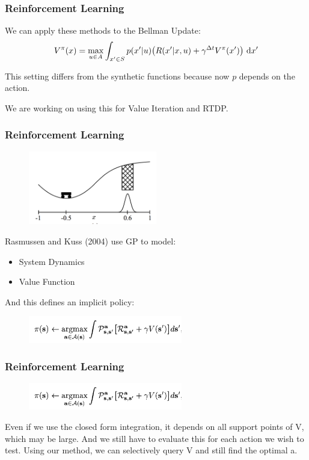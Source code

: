 \documentclass[11pt]{beamer}
\begin{document}
\begin{frame}
\frametitle{Reinforcement Learning}
We can apply these methods to the Bellman Update:
 \[V^{\pi}(x) = \max_{u \in A} \int_{x' \in S} p(x'|u)\big(R(x'|x,u) + \gamma^{\Delta t}V^{\pi}(x')\big) \ \textup{d}x' \]

This setting differs from the synthetic functions because now $p$ depends on the action.
\newline \newline

We are working on using this for Value Iteration and RTDP.
\end{frame}

\begin{frame}
\frametitle{Reinforcement Learning}
\begin{figure}
	\includegraphics[width=0.5\textwidth]{mcar}
\end{figure}
Rasmussen and Kuss (2004) use GP to model:
\begin{itemize}
	\item System Dynamics
	\item Value Function 
\end{itemize}
And this defines an implicit policy:
\begin{figure}
	\includegraphics[width=0.6\textwidth]{integral}
\end{figure}
\end{frame}

\begin{frame}
\frametitle{Reinforcement Learning}
\begin{figure}
	\includegraphics[width=0.6\textwidth]{integral}
\end{figure}
Even if we use the closed form integration, it depends on all support points of V, which may be large. And we still have to evaluate this for each action we wish to test.
\newline \newline
Using our method, we can selectively query V and still find the optimal a.
\end{frame}
\end{document}

